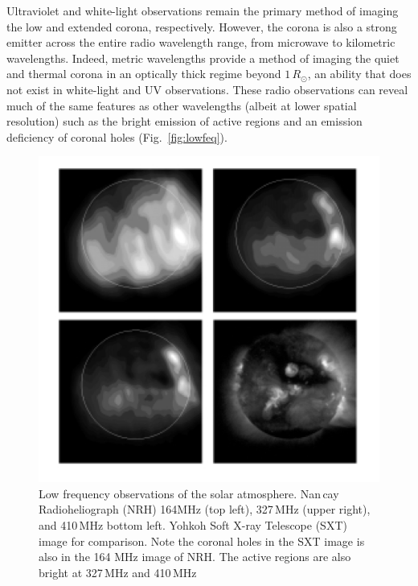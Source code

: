 Ultraviolet and white-light observations remain the primary method of imaging the low and extended corona, respectively. However, the corona is also a strong emitter across the entire radio wavelength range, from microwave to kilometric wavelengths. Indeed, metric wavelengths provide a method of imaging the quiet and thermal corona in an optically thick regime beyond $1\,R_{\odot}$, an ability that does not exist in white-light and UV observations. These radio observations can reveal much of the same features as other wavelengths (albeit at lower spatial resolution) such as the bright emission of active regions and an emission deficiency of coronal holes (Fig.~\ref{fig:lowfeq}).
\begin{figure}[t!]
\begin{center}
\includegraphics[scale=0.55, trim=0cm 1cm 0cm 1cm]{images/low_freq_obs}
\caption[Comparison of soft X-ray and low frequency radio observations of the corona]{Low frequency observations of the solar atmosphere. Nan\,{c}ay Radioheliograph (NRH) 164MHz (top left), 327\,MHz (upper right), and 410\,MHz bottom left. Yohkoh Soft X-ray Telescope (SXT) image for comparison. Note the coronal holes in the SXT image is also in the 164 MHz image of NRH. The active regions are also bright at 327\,MHz and 410\,MHz \citep{lantos1999}}
\label{fig:lowfreq}
\end{center}
\end{figure}

